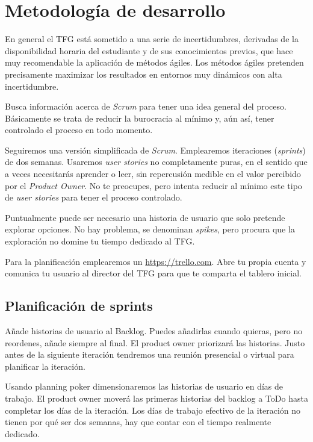 \section{Metodología de desarrollo}

En general el TFG está sometido a una serie de incertidumbres, derivadas de la disponibilidad horaria del estudiante y de sus conocimientos previos, que hace muy recomendable la aplicación de métodos ágiles.  Los métodos ágiles pretenden precisamente maximizar los resultados en entornos muy dinámicos con alta incertidumbre.

Busca información acerca de \emph{Scrum} para tener una idea general del proceso.  Básicamente se trata de reducir la burocracia al mínimo y, aún así, tener controlado el proceso en todo momento.

Seguiremos una versión simplificada de \emph{Scrum}. Emplearemos iteraciones (\emph{sprints}) de dos semanas.  Usaremos \emph{user stories} no completamente puras, en el sentido que a veces necesitarás aprender o leer, sin repercusión medible en el valor percibido por el \emph{Product Owner}. No te preocupes, pero intenta reducir al mínimo este tipo de \emph{user stories} para tener el proceso controlado.

Puntualmente puede ser necesario una historia de usuario que solo pretende explorar opciones. No hay problema, se denominan \emph{spikes}, pero procura que la exploración no domine tu tiempo dedicado al TFG.

Para la planificación emplearemos un \href{tablero Trello}{https://trello.com}.  Abre tu propia cuenta y comunica tu usuario al director del TFG para que te comparta el tablero inicial.

\subsection{Planificación de sprints}

Añade historias de usuario al Backlog. Puedes añadirlas cuando quieras, pero no reordenes, añade siempre al final. El product owner priorizará las historias. Justo antes de la siguiente iteración tendremos una reunión presencial o virtual para planificar la iteración.

Usando planning poker dimensionaremos las historias de usuario en días de trabajo. El product owner moverá las primeras historias del backlog a ToDo hasta completar los días de la iteración. Los días de trabajo efectivo de la iteración no tienen por qué ser dos semanas, hay que contar con el tiempo realmente dedicado.


